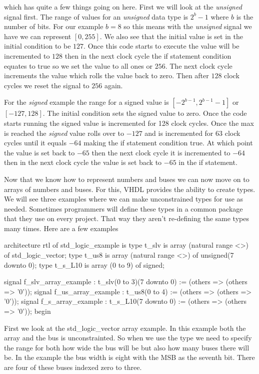 which has quite a few things going on here. First we will look at the \emph{unsigned} signal first. The range of values for an \emph{unsigned}	data type is $2^b-1$ where $b$ is the number of bits. For our example $b=8$ so this means with the \emph{unsigned} signal we have we can represent $[0,255]$. We also see that the initial value is set in the initial condition to be $127$. Once this code starts to execute the value will be incremented to $128$ then in the next clock cycle the if statement condition equates to true so we set the value to all ones or $256$. The next clock cycle increments the value which rolls the value back to zero. Then after $128$ clock cycles we reset the signal to $256$ again. 

For the \emph{signed} example the range for a signed value is $[-2^{b-1},2^{b-1}-1]$ or $[-127,128]$. The initial condition sets the signed value to zero. Once the code starts running the signed value is incremented for 128 clock cycles. Once the max is reached the \emph{signed} value rolls over to $-127$ and is incremented for $63$ clock cycles until it equals $-64$ making the if statement condition true. At which point the value is set back to $-65$ then the next clock cycle it is incremented to $-64$ then in the next clock cycle the value is set back to $-65$ in the if statement. 

Now that we know how to represent numbers and buses we can now move on to arrays of numbers and buses. For this, \ac{VHDL} provides the ability to create types. We will see three examples where we can make unconstrained types for use as needed. Sometimes programmers will define these types in a common package that they use on every project. That way they aren't re-defining the same types many times. Here are a few examples

\begin{VHDLlisting}[tabsize=4]
architecture rtl of std_logic_example is
	type t_slv is array (natural range <>) of std_logic_vector;
	type t_us8 is array (natural range <>) of unsigned(7 downto 0);
	type t_s_L10 is array (0 to 9) of signed;

	signal f_slv_array_example : t_slv(0 to 3)(7 downto 0) := (others => (others => '0'));
	signal f_us_array_example  : t_us8(0 to 4)             := (others => (others => '0'));
	signal f_s_array_example   : t_s_L10(7 downto 0)       := (others => (others => '0'));
begin
\end{VHDLlisting}

First we look at the std\_logic\_vector array example. In this example both the array and the bus is unconstrainted. So when we use the type we need to specify the range for both how wide the bus will be but also how many buses there will be. In the example the bus width is eight with the \ac{MSB} as the seventh bit. There are four of these buses indexed zero to three. 

